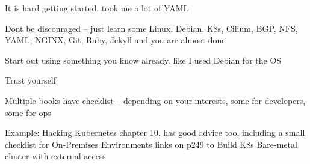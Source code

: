 \documentclass[Screen16to9,17pt]{foils}
\begin{document}


\begin{list2}
\item It is hard getting started, took me a lot of YAML \smiley
\item Dont be discouraged -- just learn some Linux, Debian, K8s, Cilium, BGP, NFS, YAML, NGINX, Git, Ruby, Jekyll and you are almost done
\item Start out using something you know already. like I used Debian for the OS
\item Trust yourself

\item Multiple books have checklist -- depending on your interests, some for developers, some for ops



\item Example: Hacking Kubernetes chapter 10. has good advice too, including a small checklist for On-Premises Environments links on p249 to Build K8s Bare-metal cluster with external access\\
 \\
 \\
\end{list2}


\myquestionspage


\end{document}
